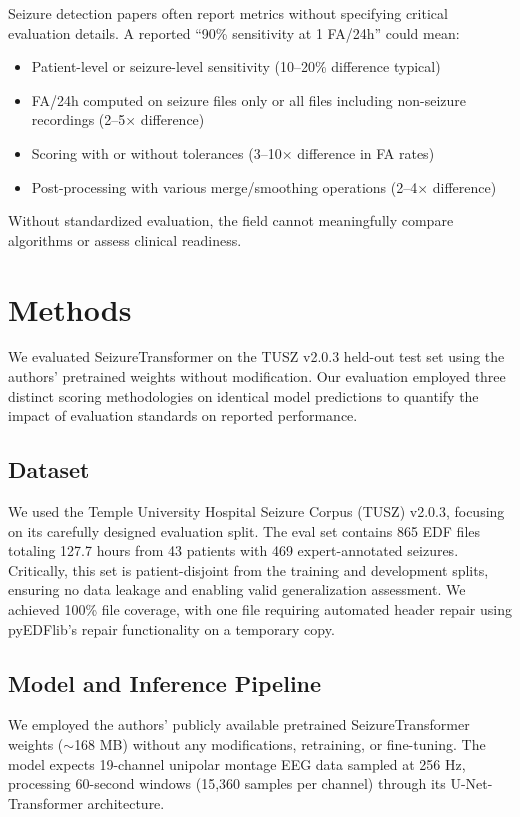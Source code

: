 \documentclass[10pt,a4paper]{article}
\begin{document}
Seizure detection papers often report metrics without specifying critical evaluation details. A reported ``90\% sensitivity at 1 FA/24h'' could mean:
\begin{itemize}
    \item Patient-level or seizure-level sensitivity (10--20\% difference typical)
    \item FA/24h computed on seizure files only or all files including non-seizure recordings (2--5$\times$ difference)
    \item Scoring with or without tolerances (3--10$\times$ difference in FA rates)
    \item Post-processing with various merge/smoothing operations (2--4$\times$ difference)
\end{itemize}

Without standardized evaluation, the field cannot meaningfully compare algorithms or assess clinical readiness.

\section{Methods}

We evaluated SeizureTransformer on the TUSZ v2.0.3 held-out test set using the authors' pretrained weights without modification. Our evaluation employed three distinct scoring methodologies on identical model predictions to quantify the impact of evaluation standards on reported performance.

\subsection{Dataset}

We used the Temple University Hospital Seizure Corpus (TUSZ) v2.0.3, focusing on its carefully designed evaluation split. The eval set contains 865 EDF files totaling 127.7 hours from 43 patients with 469 expert-annotated seizures. Critically, this set is patient-disjoint from the training and development splits, ensuring no data leakage and enabling valid generalization assessment. We achieved 100\% file coverage, with one file requiring automated header repair using pyEDFlib's repair functionality on a temporary copy.

\subsection{Model and Inference Pipeline}

We employed the authors' publicly available pretrained SeizureTransformer weights ($\sim$168 MB) without any modifications, retraining, or fine-tuning. The model expects 19-channel unipolar montage EEG data sampled at 256 Hz, processing 60-second windows (15,360 samples per channel) through its U-Net-Transformer architecture.
\end{document}
